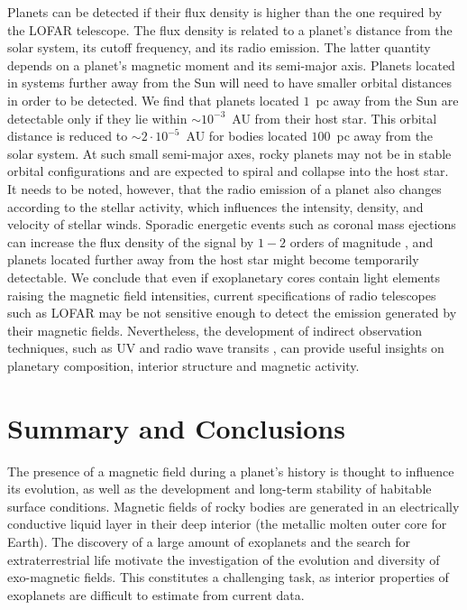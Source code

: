 \documentclass[draft]{agujournal2019} %
\newcommand{\irene}[1]{\textcolor{orange}{\textit{(Irene: #1)}}}
\begin{document}
Planets can be detected if their flux density is higher than the one required by the LOFAR telescope. The flux density is related to a planet's distance from the solar system, its cutoff frequency, and its radio emission. The latter quantity depends on a planet's magnetic moment and its semi-major axis. Planets located in systems further away from the Sun will need to have smaller orbital distances in order to be detected. We find that planets located $1$~pc away from the Sun are detectable only if they lie within $\sim 10^{-3}$~AU from their host star. This orbital distance is reduced to $\sim 2\cdot 10^{-5}$~AU for bodies located $100$~pc away from the solar system. At such small semi-major axes, rocky planets may not be in stable orbital configurations and are expected to spiral and collapse into the host star. It needs to be noted, however, that the radio emission of a planet also changes according to the stellar activity, which influences the intensity, density, and velocity of stellar winds. Sporadic energetic events such as coronal mass ejections can increase the flux density of the signal by $1-2$ orders of magnitude \cite{farrell1999possibility}, and planets located further away from the host star might become temporarily detectable. We conclude that even if exoplanetary cores contain light elements raising the magnetic field intensities, current specifications of radio telescopes such as LOFAR may be not sensitive enough to detect the emission generated by their magnetic fields. Nevertheless, the development of indirect observation techniques, such as UV and radio wave transits \cite{fossati2010metals,withers2017occultations}, can provide useful insights on planetary composition, interior structure and magnetic activity. 


\section{Summary and Conclusions}\label{sec:conclusions}
The presence of a magnetic field during a planet's history is thought to influence its evolution, as well as the development and long-term stability of habitable surface conditions. Magnetic fields of rocky bodies are generated in an electrically conductive liquid layer in their deep interior (the metallic molten outer core for Earth). The discovery of a large amount of exoplanets and the search for extraterrestrial life motivate the investigation of the evolution and diversity of exo-magnetic fields. This constitutes a challenging task, as interior properties of exoplanets are difficult to estimate from current data.
\end{document}
